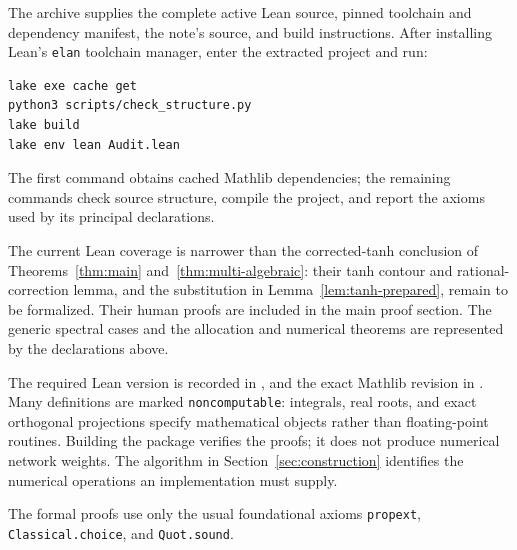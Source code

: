 \documentclass[11pt,letterpaper]{article}
\theoremstyle{definition}
\theoremstyle{remark}
\begin{document}
The archive supplies the complete active Lean source, pinned toolchain and
dependency manifest, the note's source, and build instructions.
After installing Lean's \texttt{elan} toolchain manager, enter the extracted
project and run:
\begin{verbatim}
lake exe cache get
python3 scripts/check_structure.py
lake build
lake env lean Audit.lean
\end{verbatim}
The first command obtains cached Mathlib dependencies; the remaining commands
check source structure, compile the project, and report the axioms used by its
principal declarations.

The current Lean coverage is narrower than the corrected-tanh conclusion of
Theorems~\ref{thm:main} and~\ref{thm:multi-algebraic}: their tanh contour and
rational-correction lemma, and the substitution in
Lemma~\ref{lem:tanh-prepared}, remain to be formalized. Their human proofs
are included in the main proof section. The generic spectral cases and the
allocation and numerical theorems are represented by the declarations above.

The required Lean version is recorded in
, and the exact Mathlib revision in
.
Many definitions are marked \texttt{noncomputable}: integrals, real roots,
and exact orthogonal projections specify mathematical objects rather than
floating-point routines. Building the package verifies the proofs; it does not
produce numerical network weights. The algorithm in Section~\ref{sec:construction} identifies
the numerical operations an implementation must supply.

The formal proofs use only the usual foundational axioms
\texttt{propext}, \texttt{Classical.choice}, and \texttt{Quot.sound}.
\end{document}
